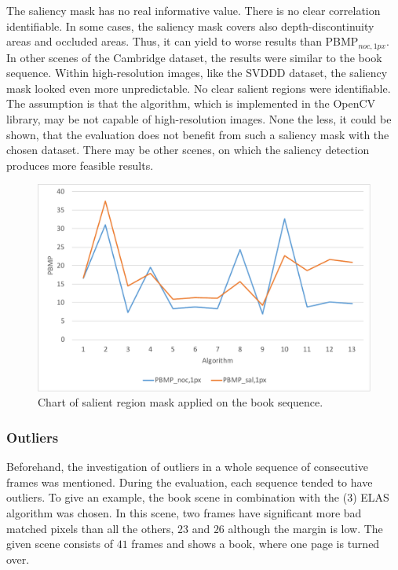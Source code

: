 \noindent The saliency mask has no real informative value.
There is no clear correlation identifiable.
In some cases, the saliency mask covers also depth-discontinuity areas and occluded areas.
Thus, it can yield to worse results than PBMP$_{noc,1px}$.
In other scenes of the Cambridge dataset, the results were similar to the book sequence.
Within high-resolution images, like the SVDDD dataset, the saliency mask looked even more unpredictable.
No clear salient regions were identifiable.
The assumption is that the algorithm, which is implemented in the OpenCV library, may be not capable of high-resolution images.
None the less, it could be shown, that the evaluation does not benefit from such a saliency mask with the chosen dataset.
There may be other scenes, on which the saliency detection produces more feasible results.

\begin{figure}[h!]
\centering
\includegraphics[width=1.0\textwidth]{src/images/evaluation/plots/01-book-pbmp-sal-1.pdf}
\caption[Chart of salient region mask]{Chart of salient region mask applied on the book sequence.}
\label{fig:eval-plots-pbmp-sal}
\end{figure}

\subsubsection{Outliers}

Beforehand, the investigation of outliers in a whole sequence of consecutive frames was mentioned.
During the evaluation, each sequence tended to have outliers.
To give an example, the book scene in combination with the (3) ELAS algorithm was chosen.
In this scene, two frames have significant more bad matched pixels than all the others, $23$ and $26$ although the margin is low.
The given scene consists of $41$ frames and shows a book, where one page is turned over.

